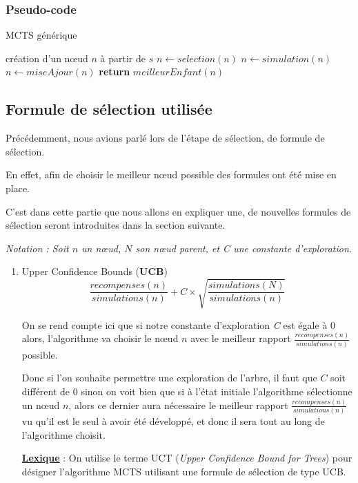 \documentclass[pdftex,french, english]{article}	%
\begin{document}
	\subsubsection{Pseudo-code}
	\begin{algorithm}
	\caption{MCTS générique}
	  \label{alg:mcts}
	\begin{algorithmic}[1]
	\State création d'un nœud $n$ à partir de $s$
			\State $n \gets selection(n)$ 
			\State $n \gets simulation(n)$
			\State $n \gets miseAjour(n)$
		\EndWhile
	\State \textbf{return} $meilleurEnfant(n)$
	\EndFunction
	\end{algorithmic}
	\end{algorithm}
    
    
    
    
    
	\subsection{Formule de sélection utilisée} \label{selection}
	Précédemment, nous avions parlé lors de l'étape de sélection, de formule de sélection. 

	En effet, afin de choisir le meilleur nœud possible des formules ont été mise en place.

	C'est dans cette partie que nous allons en expliquer une, de nouvelles formules de sélection seront introduites
	dans la section suivante.


	\textit{Notation : Soit $n$ un nœud, $N$ son nœud parent, et C une constante d'exploration.} 

	\begin{enumerate}
		\item Upper Confidence Bounds (\textbf{UCB}) \\
		\[ \frac{recompenses(n)}{simulations(n)} + C \times \sqrt{\frac{simulations(N)}{simulations(n)}} \] 

		On se rend compte ici que si notre constante d'exploration \textit{C} est égale à $0$ alors, l'algorithme va choisir le nœud $n$ avec le meilleur rapport $\frac{recompenses(n)}{simulations(n)}$ possible. 

		Donc si l'on souhaite permettre une exploration de l'arbre, il faut que $C$ soit différent de $0$ sinon on voit bien que si à l'état initiale l'algorithme sélectionne un nœud $n$, alors ce dernier aura nécessaire le meilleur rapport $\frac{recompenses(n)}{simulations(n)}$ vu qu'il est le seul à avoir été développé, et donc il sera tout au long de l'algorithme choisit. 


		\underline{\textbf{Lexique}} : On utilise le terme UCT (\textit{Upper Confidence Bound for Trees}) pour désigner l'algorithme MCTS utilisant une formule de sélection de type UCB.
	\end{enumerate}
\end{document}
